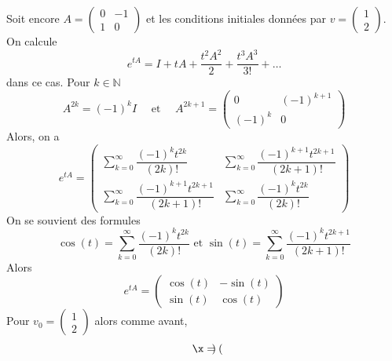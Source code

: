 \begin{example} 
  Soit encore 
  $A =
  \begin{pmatrix}
    0 & -1\\
    1 & 0
  \end{pmatrix}$ et les conditions initiales données par $v =  \left(\begin{smallmatrix}
    1\\2
  \end{smallmatrix}\right)$.
  On calcule 
  \begin{displaymath}
    e^{tA} =  I+tA+\dfrac{t^{2}A^{2}}{2}+\dfrac{t^{3}A^{3}}{3!}+\dots 
  \end{displaymath}
dans ce cas. 
Pour  $k∈ ℕ$ 
\begin{displaymath}
  A^{2k}=(-1)^{k} I  \quad \text{ et } \quad  A^{2k+1}=
\begin{pmatrix}
    0 & (-1)^{k+1}\\
    (-1)^{k} & 0
\end{pmatrix} 
\end{displaymath}
Alors, on a 
\begin{displaymath} 
  e^{tA} = 
  \begin{pmatrix} \displaystyle 
     \sum_{k=0}^{\infty}\dfrac{(-1)^{k}t^{2k}}{(2k)!} &  \displaystyle \sum_{k=0}^{\infty}\dfrac{(-1)^{k+1}t^{2k+1}}{(2k+1)!}\\
    \displaystyle \sum_{k=0}^{\infty}\dfrac{(-1)^{k+1}t^{2k+1}}{(2k+1)!} & \displaystyle \sum_{k=0}^{\infty}\dfrac{(-1)^{k}t^{2k}}{(2k)!}
\end{pmatrix}
\end{displaymath}
On se souvient des formules 
\begin{displaymath}
  \cos(t) =\displaystyle \sum_{k=0}^{\infty}\dfrac{(-1)^{k}t^{2k}}{(2k)!} \text{ et }\sin(t) =\displaystyle \sum_{k=0}^{\infty}\dfrac{(-1)^{k}t^{2k+1}}{(2k+1)!} 
\end{displaymath}
Alors
\begin{displaymath}
  e^{tA} = \begin{pmatrix}
    \cos(t)&-\sin(t)\\
    \sin(t)&\cos(t)
  \end{pmatrix}
\end{displaymath}
Pour  $v_0 = 
\begin{pmatrix}
    1\\
    2
\end{pmatrix} $ 
alors comme avant, 
\begin{displaymath}
  \x = \begin{pmatrix}

\end{pmatrix}
\end{displaymath}
\end{example}
